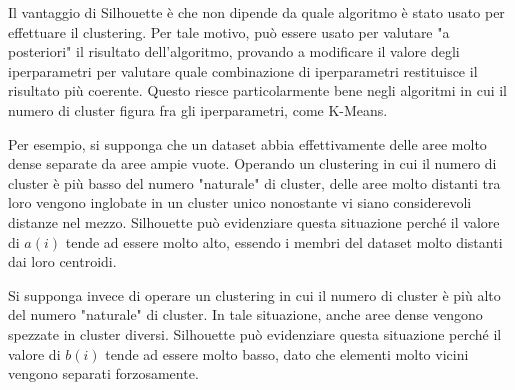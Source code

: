 \documentclass[a4paper, 12pt]{report}
\begin{document}
			Il vantaggio di Silhouette è che non dipende da quale algoritmo
			è stato usato per effettuare il clustering. Per tale motivo, può
			essere usato per valutare "a posteriori" il risultato dell'algoritmo,
			provando a modificare il valore degli iperparametri per valutare
			quale combinazione di iperparametri restituisce il risultato più
			coerente. Questo riesce particolarmente bene negli algoritmi in
			cui il numero di cluster figura fra gli iperparametri, come K-Means.

			Per esempio, si supponga che un dataset abbia effettivamente
			delle aree molto dense separate da aree ampie vuote. Operando
			un clustering in cui il numero di cluster è più basso del numero
			"naturale" di cluster, delle aree molto distanti tra loro vengono
			inglobate in un cluster unico nonostante vi siano considerevoli
			distanze nel mezzo. Silhouette può evidenziare questa situazione
			perché il valore di $a(i)$ tende ad essere molto alto, essendo
			i membri del dataset molto distanti dai loro centroidi.

			Si supponga invece di operare un clustering in cui il numero
			di cluster è più alto del numero "naturale" di cluster. In tale
			situazione, anche aree dense vengono spezzate in cluster diversi.
			Silhouette può evidenziare questa situazione perché il valore di
			$b(i)$ tende ad essere molto basso, dato che elementi molto vicini
			vengono separati forzosamente.
\end{document}
